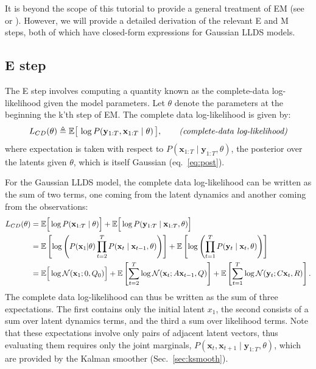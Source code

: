 \documentclass[10pt]{article}
\newcommand{\vx}{\mathbf{x}}
\newcommand{\vy}{\mathbf{y}}
\begin{document}
It is beyond the scope of this tutorial to provide a general treatment
of EM (see \cite{BishopBook} or \cite{MurphyBook}).  However, we will
provide a detailed derivation of the relevant E and M steps, both of
which have closed-form expressions for Gaussian LLDS models.

\subsection{E step}

The E step involves computing a quantity known as the complete-data
log-likelihood given the model parameters. Let $\theta$ denote the
parameters at the beginning the k'th step of EM.  The complete data
log-likelihood is given by: 
\begin{equation}
  \label{eq:CDLL}
  L_{CD}(\theta) \triangleq \E \big[\, \log P(\vy_{1:T}, \vx_{1:T}
  \mid \theta)\, \big],  \qquad 
  \textit{(complete-data log-likelihood)}   
\end{equation}  
where expectation is taken with respect to
$P(\vx_{1:T} \mid \vy_{1:T}, \theta)$, the posterior over the latents
given $\theta$, which is itself Gaussian (eq.~\ref{eq:post}).

For the Gaussian LLDS model, the complete data log-likelihood can be
written as the sum of two terms, one coming from the latent dynamics
and another coming from the observations:
\begin{align}
     \label{eq:LCD}
  L_{CD}(\theta)  &=   \E \Big[ \log P(\vx_{1:T} \mid \theta) \Big] + \E \Big[
                    \log P(\vy_{1:T} \mid \vx_{1:T}, \theta) \Big] \\
                    &= \E \left[ \log \left( P(\vx_1 | \theta) \prod_{t=2}^{T}
                  P(\vx_{t} \mid \vx_{t-1}, \theta )\right) \right]
                 + \E \left[ \log \left( \prod_{t=1}^T P(\vy_t \mid \vx_t,
                      \theta) 
                  \right) \right] \\
   &= \E \Big[ \log \Nrm(\vx_1; 0, Q_0)\Big]  + \E \left[ \sum_{t=2}^{T} \log \Nrm(\vx_{t};
                  A\vx_{t-1} ,  Q) \right] +  \E\left[\sum_{t=1}^T \log \Nrm(\vy_t ;
                  C\vx_t,R) \right].
\end{align}
The complete data log-likelihood can thus be written as the sum of three
expectations.  The first contains only the initial latent $x_1$, the
second consists of a sum over latent dynamics terms, and the third a
sum over likelihood terms.  Note that these expectations involve only
pairs of adjacent latent vectors, thus evaluating them requires only
the joint marginals, $P(\vx_t,\vx_{t+1} \mid \vy_{1:T}, \theta)$, which
are provided by the Kalman smoother (Sec.~\ref{sec:ksmooth}).
\end{document}
